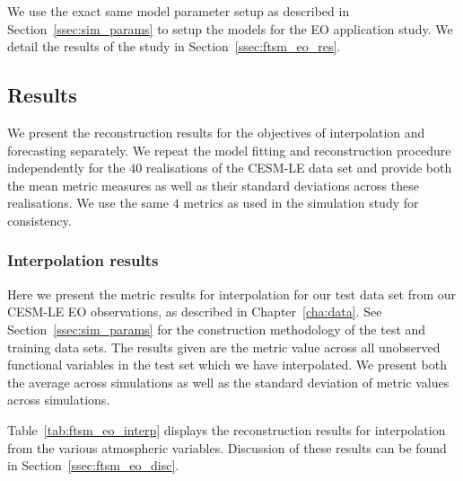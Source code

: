 We use the exact same model parameter setup as described in Section~\ref{ssec:sim_params} to setup the models for the EO application study.
We detail the results of the study in Section~\ref{ssec:ftsm_eo_res}.

\subsection{Results \label{ssec:ftsm_eo_res}}
We present the reconstruction results for the objectives of interpolation and forecasting separately. 
We repeat the model fitting and reconstruction procedure independently for the $40$ realisations of the CESM-LE data set and provide both the mean metric measures as well as their standard deviations across these realisations. 
We use the same $4$ metrics as used in the simulation study for consistency. 

\subsubsection{Interpolation results}
Here we present the metric results for interpolation for our test data set from our CESM-LE EO observations, as described in Chapter~\ref{cha:data}.
See Section~\ref{ssec:sim_params} for the construction methodology of the test and training data sets. 
The results given are the metric value across all unobserved functional variables in the test set which we have interpolated.
We present both the average across simulations as well as the standard deviation of metric values across simulations.

Table~\ref{tab:ftsm_eo_interp} displays the reconstruction results for interpolation from the various atmospheric variables.
Discussion of these results can be found in Section~\ref{ssec:ftsm_eo_disc}.

